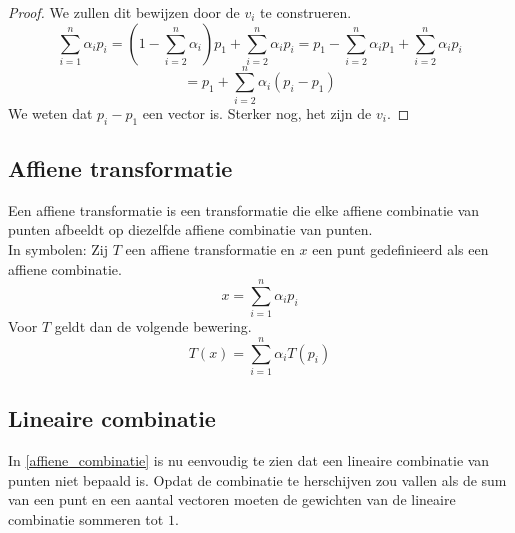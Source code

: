 \documentclass[computergesteund_ontwerp_van_curven_en_oppervlakken.tex]{subfiles}
\begin{document}
\begin{proof}
We zullen dit bewijzen door de $v_i$ te construeren.
\[
\sum_{i=1}^n\alpha_ip_i
= \left(1-\sum_{i=2}^n\alpha_i\right)p_1 + \sum_{i=2}^n\alpha_ip_i
= p_1 - \sum_{i=2}^n\alpha_ip_1 + \sum_{i=2}^n\alpha_ip_i
\]
\[
=
p_1 + \sum_{i=2}^n\alpha_i(p_i-p_1)
\]
We weten dat $p_i-p_1$ een vector is. Sterker nog, het zijn de $v_i$.
\end{proof}

\subsection{Affiene transformatie}
\label{affiene_transformatie}
Een affiene transformatie is een transformatie die elke affiene combinatie van punten afbeeldt op diezelfde affiene combinatie van punten.\\
In symbolen: Zij $T$ een affiene transformatie en $x$ een punt gedefinieerd als een affiene combinatie.
\[
x = \sum_{i=1}^{n}\alpha_ip_i
\]
Voor $T$ geldt dan de volgende bewering.
\[
T(x) = \sum_{i=1}^{n}\alpha_iT(p_i)
\]
 
\subsection{Lineaire combinatie}
In \ref{affiene_combinatie} is nu eenvoudig te zien dat een lineaire combinatie van punten niet bepaald is.
Opdat de combinatie te herschijven zou vallen als de sum van een punt en een aantal vectoren moeten de gewichten van de lineaire combinatie sommeren tot $1$. 
\end{document}
